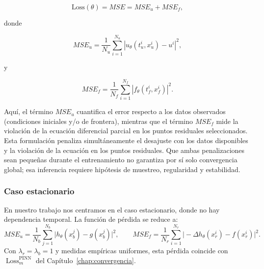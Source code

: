 \[
\text{Loss}(\theta) = MSE = MSE_u + MSE_f,
\]

donde

\[
MSE_u = \frac{1}{N_u}\sum_{i=1}^{N_u}\left|u_{\theta}(t_u^i, x_u^i)-u^i\right|^2,
\]

y

\[
MSE_f = \frac{1}{N_f}\sum_{i=1}^{N_f}\left|f_{\theta}(t_f^i, x_f^i)\right|^2.
\]

Aquí, el término \(MSE_u\) cuantifica el error respecto a los datos observados (condiciones iniciales y/o de frontera), mientras que el término \(MSE_f\) mide la violación de la ecuación diferencial parcial en los puntos residuales seleccionados. Esta formulación penaliza simultáneamente el desajuste con los datos disponibles y la violación de la ecuación en los puntos residuales. Que ambas penalizaciones sean pequeñas durante el entrenamiento no garantiza por sí solo convergencia global; esa inferencia requiere hipótesis de muestreo, regularidad y estabilidad.


\subsubsection*{Caso estacionario}
En nuestro trabajo nos centramos en el caso estacionario, donde no hay dependencia temporal.
La función de pérdida se reduce a:
\[
MSE_u=\frac{1}{N_b}\sum_{j=1}^{N_b}\big|h_\theta(x_b^j)-g(x_b^j)\big|^2,\qquad
MSE_f=\frac{1}{N_r}\sum_{i=1}^{N_r}\big|-\Delta h_\theta(x_r^i)-f(x_r^i)\big|^2.
\]
Con $\lambda_r=\lambda_b=1$ y medidas empíricas uniformes, esta pérdida coincide con $\operatorname{Loss}^{\mathrm{PINN}}_m$ del Capítulo~\ref{chap:convergencia}.
